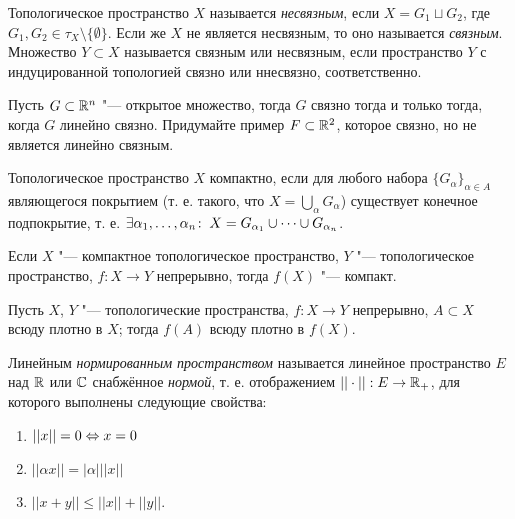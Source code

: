 \documentclass[main]{subfiles}
\begin{document}
\begin{definition}
  Топологическое пространство \( X \) называется \emph{несвязным},
  если \( X = G_1 \sqcup G_2 \), где
  \( G_1, G_2 \in \tau_X \setminus \{ \emptyset \} \).
  Если же \( X \) не является несвязным, то оно
  называется \emph{связным}. Множество \( Y \subset X \) называется
  связным или несвязным, если пространство
  \( Y \) с индуцированной топологией связно или ннесвязно,
  соответственно.
\end{definition}

\begin{exercise}
  Пусть \( G \subset \mathbb{R}^n \) "--- открытое множество, тогда
  \( G \) связно тогда и только тогда, когда \( G \)
  линейно связно. Придумайте пример \( F \subset \mathbb{R}^2 \),
  которое связно, но не является линейно связным.
\end{exercise}

\begin{definition}
  Топологическое пространство \( X \) компактно,
  если для любого набора \( \{ G_\alpha \}_{\alpha \in A} \)
  являющегося покрытием (т. е. такого,
  что \( X = \bigcup_\alpha G_\alpha \)) существует
  конечное подпокрытие, т. е.
  \( \exists \alpha_1, \dots, \alpha_n \colon \: X = G_{\alpha_1} \cup
  \dots \cup G_{\alpha_n} \).
\end{definition}

\begin{exercise}
  Если \( X \) "--- компактное топологическое пространство,
  \( Y \) "--- топологическое пространство,
  \( f : X \to Y \) непрерывно, тогда \( f(X) \) "--- компакт.
\end{exercise}

\begin{exercise}
  Пусть \( X \), \( Y \) "--- топологические пространства,
  \( f : X \to Y \) непрерывно, \( A \subset X \) всюду
  плотно в \( X \); тогда \( f(A) \) всюду плотно в \( f(X) \).
\end{exercise}

\begin{definition}
  Линейным \emph{нормированным пространством} называется
  линейное пространство \( E \) над \( \mathbb{R} \) или \( \mathbb{C} \)
  снабжённое \emph{нормой}, т. е. отображением
  \( || \cdot || : E \to \mathbb{R}_+ \), для которого выполнены
  следующие свойства:
  \begin{enumerate}
    \item \( ||x|| = 0 \Leftrightarrow x = 0 \)
    \item \( ||\alpha x|| = |\alpha| ||x|| \)
    \item \( ||x + y || \le ||x|| + ||y|| \).
  \end{enumerate}
\end{definition}
\end{document}
